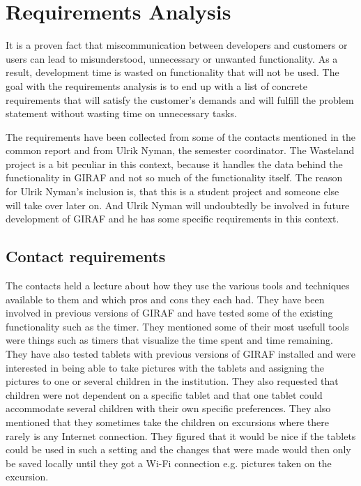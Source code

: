 \section{Requirements Analysis}
It is a proven fact that miscommunication between developers and customers or users can lead to misunderstood, unnecessary or unwanted functionality.\cite{req_wrong} %
As a result, development time is wasted on functionality that will not be used. The goal with the requirements analysis is to end up with a list of concrete requirements that will satisfy the customer's demands and will fulfill the problem statement without wasting time on unnecessary tasks. 

The requirements have been collected from some of the contacts mentioned in the common report and from Ulrik Nyman, the semester coordinator. The Wasteland project is a bit peculiar in this context, because it handles the data behind the functionality in GIRAF and not so much of the functionality itself. The reason for Ulrik Nyman's inclusion is, that this is a student project and someone else will take over later on. And Ulrik Nyman will undoubtedly be involved in future development of GIRAF and he has some specific requirements in this context.

\subsection{Contact requirements}
The contacts held a lecture about how they use the various tools and techniques available to them and which pros and cons they each had. They have been involved in previous versions of GIRAF and have tested some of the existing functionality such as the timer. They mentioned some of their most usefull tools were things such as timers that visualize the time spent and time remaining. They have also tested tablets with previous versions of GIRAF installed and were interested in being able to take pictures with the tablets and assigning the pictures to one or several children in the institution. They also requested that children were not dependent on a specific tablet and that one tablet could accommodate several children with their own specific preferences. They also mentioned that they sometimes take the children on excursions where there rarely is any Internet connection. They figured that it would be nice if the tablets could be used in such a setting and the changes that were made would then only be saved locally until they got a Wi-Fi connection e.g. pictures taken on the excursion.

